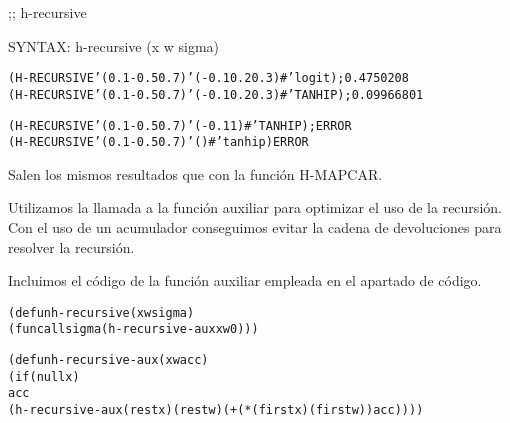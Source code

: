 \begin{aibox}{\function}
;; h-recursive

SYNTAX: h-recursive (x w sigma) 
\end{aibox}

\begin{aibox}{\examples}
\begin{alltt}
(H-RECURSIVE '(0.1 -0.5 0.7) '(-0.1 0.2 0.3) #'logit); 0.4750208
(H-RECURSIVE '(0.1 -0.5 0.7) '(-0.1 0.2 0.3) #'TANHIP); 0.09966801

(H-RECURSIVE '(0.1 -0.5 0.7) '(-0.1 1) #'TANHIP); ERROR
(H-RECURSIVE '(0.1 -0.5 0.7) '() #'tanhip) ERROR
\end{alltt}
\end{aibox}

\begin{aibox}{\comments}
Salen los mismos resultados que con la función H-MAPCAR.
\end{aibox}
\begin{aibox}{\answers}

\end{aibox}
\begin{aibox}{\othercomments}
Utilizamos la llamada a la función auxiliar para optimizar el uso de la recursión. Con el uso de un acumulador conseguimos evitar la cadena de devoluciones para resolver la recursión.

Incluimos el código de la función auxiliar empleada en el apartado de código.
\end{aibox}
\begin{aibox}{\pseudocode}

\end{aibox}
\begin{aibox}{\code}

\begin{alltt}

(defun h-recursive (x w sigma) 
        (funcall sigma (h-recursive-aux x w 0)))

(defun h-recursive-aux (x w acc)
    (if (null x)
          acc
    (h-recursive-aux (rest x) (rest w) ( + (* (first x)  (first w)) acc))))


\end{alltt}
\end{aibox}
